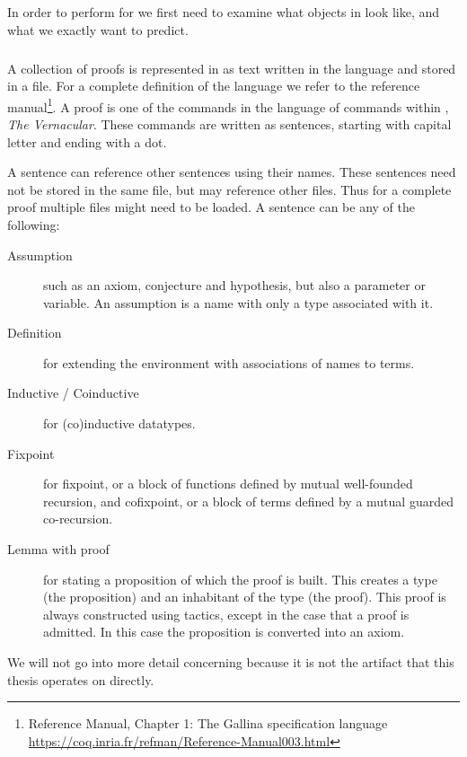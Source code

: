 \subsection{\coq}

In order to perform \premiseselection for \coq we first need to examine what objects in \coq look like, and what we exactly want to predict.

\subsubsection{\gallina}
A collection of proofs is represented in \coq as text written in the \gallina{} language \cite{huet1992gallina} and stored in a file.
For a complete definition of the \gallina language we refer to the \coq reference manual\footnote{\coq Reference Manual, Chapter 1: The Gallina specification language\\ \url{https://coq.inria.fr/refman/Reference-Manual003.html}}.
A proof is one of the commands in the language of commands within \gallina{}, \emph{The Vernacular}.
These commands are written as sentences, starting with capital letter and ending with a dot.

A sentence can reference other sentences using their names.
These sentences need not be stored in the same file, but may reference other files.
Thus for a complete proof multiple files might need to be loaded.
A sentence can be any of the following:
\begin{description}
	\item[Assumption] such as an axiom, conjecture and hypothesis, but also a parameter or variable.
		An assumption is a name with only a type associated with it.
	\item[Definition] for extending the environment with associations of names to terms.
	\item[Inductive / Coinductive] for (co)inductive datatypes.
	\item[Fixpoint] for fixpoint, or a block of functions defined by mutual well-founded recursion, and cofixpoint, or a block of terms defined by a mutual guarded co-recursion.
	\item[Lemma with proof] for stating a proposition of which the proof is built.
		This creates a type (the proposition) and an inhabitant of the type (the proof).
		This proof is always constructed using tactics, except in the case that a proof is admitted.
		In this case the proposition is converted into an axiom.
\end{description}
We will not go into more detail concerning \gallina because it is not the artifact that this thesis operates on directly.

